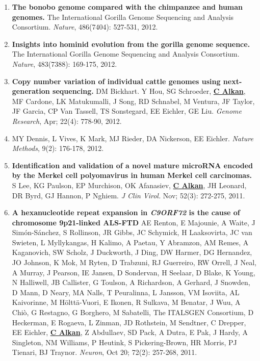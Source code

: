 \begin{enumerate}
 \item
        {\bf The bonobo genome compared with the chimpanzee and human genomes.}
        The International Gorilla Genome Sequencing and Analysis Consortium.
        {\em Nature}, 486(7404): 527-531, 2012.


\item
{\bf Insights into hominid evolution from the gorilla genome sequence.}
The International Gorilla Genome Sequencing and Analysis Consortium.
{\em Nature}, 483(7388): 169-175, 2012. 

\item
{\bf Copy number variation of individual cattle genomes using next-generation sequencing.} 
DM Bickhart. Y Hou, SG Schroeder, {\bf {\underline {C Alkan}}}, MF Cardone, LK Matukumalli, J Song, 
RD Schnabel, M Ventura, JF Taylor, JF Garcia, CP Van Tassell, TS Sonstegard, EE Eichler, GE Liu. 
{\em Genome Research}, Apr;  22(4): 778-90, 2012.

\item
MY Dennis, L Vives, K Mark, MJ Rieder, DA Nickerson, EE Eichler. {\em Nature Methods}, 9(2): 176-178, 2012.


\item
{\bf Identification and validation of a novel mature microRNA encoded by the Merkel cell polyomavirus in human Merkel cell carcinomas.}
S Lee, KG Paulson, EP Murchison, OK Afanasiev, {\bf {\underline {C Alkan}}}, JH Leonard, DR Byrd, GJ Hannon, 
P Nghiem. {\em J Clin Virol.} Nov;  52(3): 272-275, 2011. 


\item
{\bf A hexanucleotide repeat expansion in \textit{C9ORF72} is the cause of chromosome 9p21-linked ALS-FTD}  
AE Renton, E Majounie, A Waite, J Simón-Sánchez, S Rollinson, JR Gibbs, JC Schymick, H Laaksovirta, JC van Swieten, L Myllykangas, 
H Kalimo, A Paetau, Y Abramzon, AM Remes, A Kaganovich, SW Scholz, J Duckworth, J Ding, DW Harmer, DG Hernandez, JO Johnson, 
K Mok, M Ryten, D Trabzuni, RJ Guerreiro, RW Orrell, J Neal, A Murray, J Pearson, IE Jansen, D Sondervan, H Seelaar, D Blake, 
K Young, N Halliwell, JB Callister, G Toulson, A Richardson, A Gerhard, J Snowden, D Mann, D Neary, MA Nalls, T Peuralinna, 
L Jansson, VM Isoviita, AL Kaivorinne, M Hölttä-Vuori, E Ikonen, R Sulkava, M Benatar, J Wuu, A Chiò, G Restagno, 
G Borghero, M Sabatelli, The ITALSGEN Consortium, D Heckerman, E Rogaeva, L Zinman, JD Rothstein, M Sendtner, C Drepper, EE Eichler, 
{\bf {\underline {C Alkan}}}, Z Abdullaev, SD Pack, A Dutra, E Pak, J Hardy, A Singleton, NM Williams, P Heutink, S Pickering-Brown, 
HR Morris, PJ Tienari, BJ Traynor. {\em Neuron}, Oct 20;  72(2): 257-268, 2011.


\end{enumerate}
